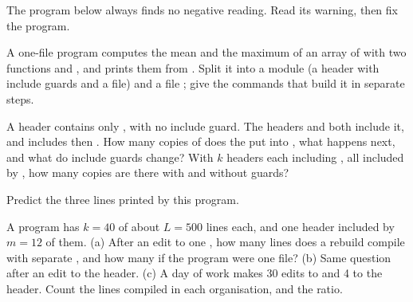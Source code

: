 \begin{exercise}[$\star\star$]\label{exo:b1:compilation-pipeline:6}
The program below always finds no negative reading. Read its warning, then fix the program.
\end{exercise}

\begin{exercise}[$\star\star$]\label{exo:b1:compilation-pipeline:7}
A one-file program computes the mean and the maximum of an array of  with two functions
 and , and prints them from
. Split it into a module  (a header with include guards and a  file) and a file
; give the commands that build it in separate steps.
\end{exercise}

\begin{exercise}[$\star\star$]\label{exo:b1:compilation-pipeline:8}
A header  contains only , with no include guard. The headers
 and  both include it, and  includes  then .
How many copies of  does the  put into , what happens next, and what do
include guards change? With $k$ headers each including , all included by , how many
copies are there with and without guards?
\end{exercise}

\begin{exercise}[$\star\star$]\label{exo:b1:compilation-pipeline:9}
Predict the three lines printed by this program.
\end{exercise}

\begin{exercise}[$\star\star\star$]\label{exo:b1:compilation-pipeline:10}
A program has $k = 40$  of about $L = 500$ lines each, and one header included by $m = 12$ of them.
(a) After an edit to one , how many lines does a rebuild compile with separate , and how
many if the program were one file? (b) Same question after an edit to the header. (c) A day of work makes 30
edits to  and 4 to the header. Count the lines compiled in each organisation, and the ratio.
\end{exercise}

